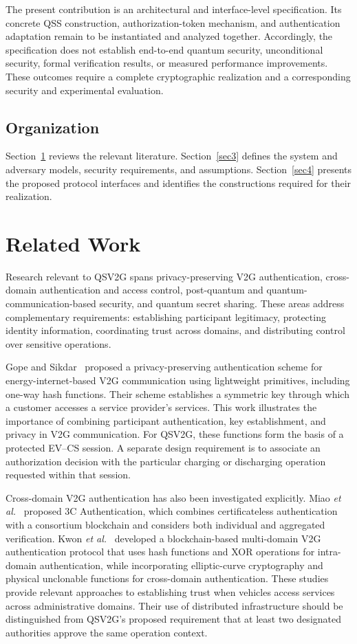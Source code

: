\documentclass[twocolumn,10pt,journal]{IEEEtran}
\begin{document}
The present contribution is an architectural and interface-level specification. Its concrete QSS construction, authorization-token mechanism, and authentication adaptation remain to be instantiated and analyzed together. Accordingly, the specification does not establish end-to-end quantum security, unconditional security, formal verification results, or measured performance improvements. These outcomes require a complete cryptographic realization and a corresponding security and experimental evaluation.

\subsection{Organization}
Section~\ref{sec2} reviews the relevant literature. Section~\ref{sec3} defines the system and adversary models, security requirements, and assumptions. Section~\ref{sec4} presents the proposed protocol interfaces and identifies the constructions required for their realization.

\section{Related Work}
\label{sec2}

Research relevant to QSV2G spans privacy-preserving V2G authentication, cross-domain authentication and access control, post-quantum and quantum-communication-based security, and quantum secret sharing. These areas address complementary requirements: establishing participant legitimacy, protecting identity information, coordinating trust across domains, and distributing control over sensitive operations.

Gope and Sikdar~\cite{gope2019efficient} proposed a privacy-preserving authentication scheme for energy-internet-based V2G communication using lightweight primitives, including one-way hash functions. Their scheme establishes a symmetric key through which a customer accesses a service provider's services. This work illustrates the importance of combining participant authentication, key establishment, and privacy in V2G communication. For QSV2G, these functions form the basis of a protected EV--CS session. A separate design requirement is to associate an authorization decision with the particular charging or discharging operation requested within that session.

Cross-domain V2G authentication has also been investigated explicitly. Miao \emph{et al.}~\cite{miao2024threec} proposed 3C Authentication, which combines certificateless authentication with a consortium blockchain and considers both individual and aggregated verification. Kwon \emph{et al.}~\cite{kwon2024multidomain} developed a blockchain-based multi-domain V2G authentication protocol that uses hash functions and XOR operations for intra-domain authentication, while incorporating elliptic-curve cryptography and physical unclonable functions for cross-domain authentication. These studies provide relevant approaches to establishing trust when vehicles access services across administrative domains. Their use of distributed infrastructure should be distinguished from QSV2G's proposed requirement that at least two designated authorities approve the same operation context.
\end{document}
